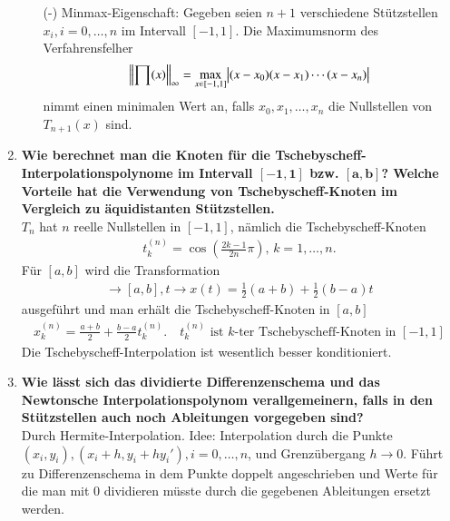 \begin{enumerate}
\begin{enumerate}
				\item[(-)] Minmax-Eigenschaft: Gegeben seien \(n+1\) verschiedene Stützstellen \(x_i, i=0,\dots,n\) im Intervall \([-1,1]\). Die Maximumsnorm des Verfahrensfelher
				\begin{align*}
					\norm{\prod(x)}_\infty=\underset{x\in[-1,1]}{\max}\abs{(x-x_0)(x-x_1)\cdots(x-x_n)}
				\end{align*}
				nimmt einen minimalen Wert an, falls \(x_0,x_1,\dots,x_n\) die Nullstellen von \(T_{n+1}(x)\) sind.
			\end{enumerate}
		\item \textbf{Wie berechnet man die Knoten für die Tschebyscheff-Interpolationspolynome im Intervall \(\mathbf{[−1,1]}\) bzw. \(\mathbf{[a,b]}\)? Welche Vorteile hat die Verwendung von Tschebyscheff-Knoten im Vergleich zu äquidistanten Stützstellen.} \\
			\(T_n\) hat \(n\) reelle Nullstellen in \([-1,1]\), nämlich die Tschebyscheff-Knoten
			\begin{align*}
				t_k^{(n)}=\cos\left( \frac{2k-1}{2n}\pi \right),\, k=1,\dots,n. 
			\end{align*}
			Für \([a,b]\) wird die Transformation
			\begin{align*}
				[-1,1]\rightarrow[a,b], t\rightarrow x(t)=\frac{1}{2}(a+b)+\frac{1}{2}(b-a)t
			\end{align*}
			ausgeführt und man erhält die Tschebyscheff-Knoten in \([a,b]\)
			\begin{align*}
				x_k^{(n)}=\frac{a+b}{2}+\frac{b-a}{2}t_k^{(n)}.\quad t_k^{(n)} \text{ ist } k\text{-ter Tschebyscheff-Knoten in }[-1,1]
			\end{align*}
			Die Tschebyscheff-Interpolation ist wesentlich besser konditioniert.
			
		\item \textbf{Wie lässt sich das dividierte Differenzenschema und das Newtonsche Interpolationspolynom verallgemeinern, falls in den Stützstellen auch noch Ableitungen vorgegeben sind?} \\
			Durch Hermite-Interpolation. Idee: Interpolation durch die Punkte \((x_i,y_i),(x_i+h,y_i+hy_i'),i=0,\dots,n\), und Grenzübergang \(h\rightarrow0\). Führt zu Differenzenschema in dem Punkte doppelt angeschrieben und Werte für die man mit 0 dividieren müsste durch die gegebenen Ableitungen ersetzt werden.
			
		\pagebreak			
		

\end{enumerate}

